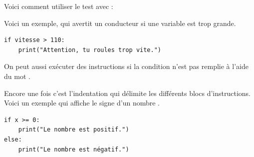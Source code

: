 \documentclass[11pt,class=report,crop=false]{standalone}
\begin{document}
\begin{cours}[Si ... alors ...]

Voici comment utiliser le test \og{}\fg{} avec \Python{} :


Voici un exemple, qui avertit un conducteur si une variable  est trop grande.
\begin{center}
\begin{minipage}{0.7\textwidth}
\begin{lstlisting}
if vitesse > 110:
    print("Attention, tu roules trop vite.")
\end{lstlisting}
\end{minipage} 
\end{center} 

On peut aussi exécuter des instructions si la condition n'est pas remplie à l'aide du mot \og{}\fg{}.


Encore une fois c'est l'indentation qui délimite les différents blocs d'instructions.
Voici un exemple qui affiche le signe d'un nombre .
\begin{center}
\begin{minipage}{0.5\textwidth}
\begin{lstlisting}
if x >= 0:
    print("Le nombre est positif.")
else:
    print("Le nombre est négatif.")
\end{lstlisting}
\end{minipage} 
\end{center} 


\end{cours}
\end{document}
